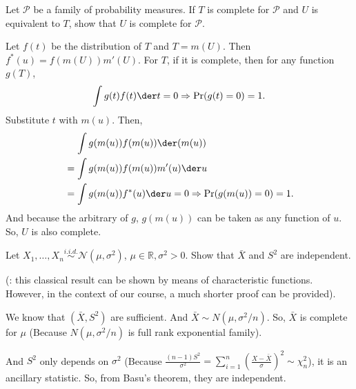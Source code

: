 \begin{ex}
    Let \(\mathcal{P}\) be a family of probability measures. If \(T\) is complete for \(\mathcal{P}\) and \(U\) is equivalent to \(T\), show that \(U\) is complete for \(\mathcal{P}\). 
\end{ex}

\begin{solution}
    Let $f(t)$ be the distribution of $T$ and $T=m(U)$. Then $f^*(u)=f(m(U))m'(U)$. For $T$, if it is complete, then for any function $g(T)$, 
    \[
        \int g(t)f(t)\der t=0 \Rightarrow \Pr(g(t)=0)=1. 
    \]
    Substitute $t$ with $m(u)$. Then, 
    \[
        \begin{aligned}
            &\quad\,\int g(m(u))f(m(u))\der (m(u))\\
            &=\int g(m(u))f(m(u))m'(u)\der u\\
            &=\int g(m(u))f^*(u)\der u=0\Rightarrow \Pr(g(m(u))=0)=1. 
        \end{aligned}
    \]
    And because the arbitrary of $g$, $g(m(u))$ can be taken as any function of $u$. So, $U$ is also complete. 
\end{solution}

\begin{ex}
    Let \(X_{1}, \ldots, X_{n} \stackrel{i.i.d. }{\sim} \mathcal{N}\left(\mu, \sigma^{2}\right)\), \(\mu \in \mathbb{R}, \sigma^{2}>0 .\) Show that \(\bar{X}\) and \(S^{2}\) are independent. 
    
    (: this classical result can be shown by means of characteristic functions. However, in the context of our course, a much shorter proof can be provided). 
\end{ex}

\begin{solution}
    We know that $(\bar{X}, S^2)$ are sufficient. And $\bar{X}\sim N(\mu,\sigma^2/n)$. So, $\bar{X}$ is complete for $\mu$ (Because $N(\mu,\sigma^2/n)$ is full rank exponential family). 
        
    And $S^2$ only depends on $\sigma^2$ (Because $\frac{(n-1)S^2}{\sigma^2}=\sum_{i=1}^n(\frac{X-\bar{X}}{\sigma})^2\sim\chi_n^2$), it is an ancillary statistic. So, from Basu's theorem, they are independent. 
\end{solution}
